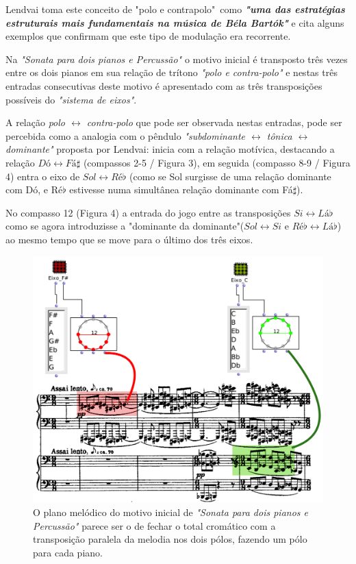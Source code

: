 \documentclass[
	12pt,				%
	openright,			%
	twoside,			%
	a4paper,			%
	english,			%
	french,				%
	spanish,			%
	brazil				%
	]{abntex2}
\begin{document}
Lendvai toma este conceito de "polo e contrapolo"\ como \textit{\textbf{"uma das estratégias estruturais mais fundamentais na música de Béla Bartók"}}\cite[p. 04]{lendvai1971bela} e cita alguns exemplos que confirmam que este tipo de modulação era recorrente.

Na \textit{"Sonata para dois pianos e Percussão"} o motivo inicial é transposto três vezes entre os dois pianos em sua relação de trítono \textit{"polo e contra-polo"} e nestas três entradas consecutivas deste motivo é apresentado com as três transposições possíveis do \textit{"sistema de eixos"}.

A relação \textit{polo $\leftrightarrow$ contra-polo} que pode ser observada nestas entradas, pode ser percebida como a analogia com o pêndulo \textit{"subdominante $\leftrightarrow$ tônica $\leftrightarrow$ dominante"} proposta por Lendvai: inicia com a relação motívica, destacando a relação $Dó \leftrightarrow Fá\sharp$ (compassos 2-5 / Figura 3), em seguida (compasso 8-9 / Figura 4) entra o eixo de $Sol \leftrightarrow Ré\flat$ (como se Sol surgisse de uma relação dominante com Dó, e Ré$\flat$ estivesse numa simultânea relação dominante com Fá$\sharp$). 

No compasso 12 (Figura 4) a entrada do jogo entre as transposições $Si \leftrightarrow Lá\flat$ como se agora introduzisse a "dominante da dominante"($Sol \leftrightarrow Si$ e $Ré\flat \leftrightarrow Lá\flat$) ao mesmo tempo que se move para o último dos três eixos.

\begin{figure}[!h]
	\caption{\label{fig_grafico}O plano melódico do motivo inicial de \textit{"Sonata para dois pianos e Percussão"}  parece ser o de fechar o total cromático com a transposição paralela da melodia nos dois pólos, fazendo um pólo para cada piano. }
	\begin{center}
	    \includegraphics[scale=0.25]{axis/sonata2pianos_dofasus.png}
	\end{center}
\end{figure}
\end{document}
